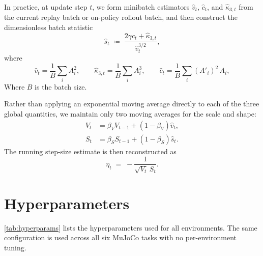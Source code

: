 \documentclass{article}
\theoremstyle{plain}
\theoremstyle{definition}
\theoremstyle{remark}
\begin{document}
In practice, at update step $t$, we form minibatch estimators $\hat v_t$, $\hat c_t$, and $\hat \kappa_{3,t}$ from the current replay batch or on-policy rollout batch, and then construct the dimensionless batch statistic
\begin{equation}
  \hat s_t
  \;\coloneqq\;
  \frac{2\gamma \hat c_t + \hat \kappa_{3,t}}{\hat v_t^{3/2}},
\end{equation}
where
\begin{equation}
  \hat v_t = \frac{1}{B}\sum_i A_i^2,
  \qquad
  \hat \kappa_{3,t} = \frac{1}{B}\sum_i A_i^3,
  \qquad
  \hat c_t = \frac{1}{B}\sum_i (A'_i)^2 \, A_i,
\end{equation}
Where $B$ is the batch size.

Rather than applying an exponential moving average directly to each of the three global quantities, we maintain only two moving averages for the scale and shape:
\begin{align}
  V_t &= \beta_V V_{t-1} + (1-\beta_V)\hat v_t, \\
  S_t &= \beta_S S_{t-1} + (1-\beta_S)\hat s_t.
\end{align}
The running step-size estimate is then reconstructed as
\begin{equation}
  \eta_t
  \;=\;
  -\frac{1}{\sqrt{V_t}\,S_t}.
\end{equation}

\section{Hyperparameters}
\label{app:hyperparams}

\cref{tab:hyperparams} lists the hyperparameters used for all environments.
The same configuration is used across all six MuJoCo tasks with no per-environment tuning.
\end{document}
